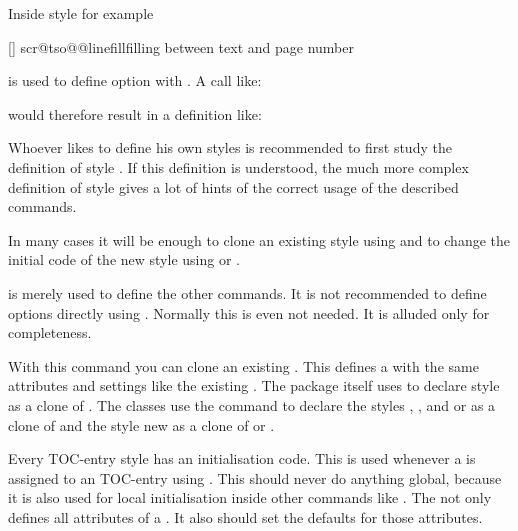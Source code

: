 Inside style  for example
\begin{lstcode}
  [\TOCLineLeaderFill]%
  {scr@tso@}{@linefill}{filling between text and page number}%
\end{lstcode}
is used to define option  with 
. A call like:
\begin{lstcode}
\end{lstcode}
would therefore result in a definition like:
\begin{lstcode}
  \def\scr@tso@part@linefill{\TOCLineLeaderFill}
\end{lstcode}

Whoever likes to define his own styles is recommended to first study the
definition of style . If this definition is understood,
the much more complex definition of style  gives a lot of
hints of the correct usage of the described commands.

In many cases it will be enough to clone an existing style using
 and to change the initial code of the new style
using  or .

 is merely used to define the other
commands. It is not recommended to define options directly using
. Normally this is even not needed. It is
alluded only for completeness.%
\EndIndexGroup


\begin{Declaration}
\end{Declaration}
With this command you can clone
an existing . This defines a  with the same
attributes and settings like the existing . The package itself
uses  to declare style  as a clone
of . The \KOMAScript{} classes use the command to
declare the styles , , and  or
 as a clone of  and the style
 new as a clone of  or .%
\EndIndexGroup


\begin{Declaration}
\end{Declaration}
Every TOC-entry style has an
initialisation code. This is used whenever a  is assigned to an
TOC-entry using . This  should
never do anything global, because it is also used for local initialisation
inside other commands like . The
 not only defines all attributes of a . It
also should set the defaults for those attributes.

